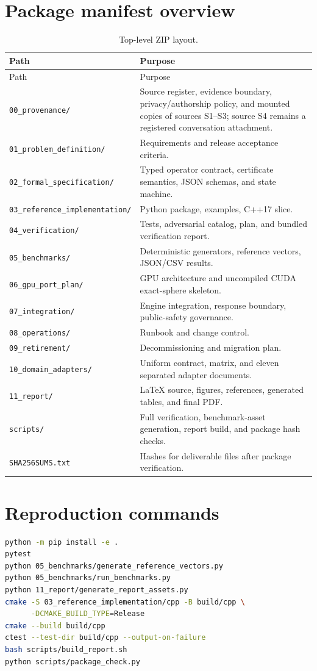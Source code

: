 \documentclass[11pt,a4paper,openany]{book}
\begin{document}
\chapter{Package manifest overview}
\begin{longtable}{@{}L{0.36\textwidth}L{0.54\textwidth}@{}}
\caption{Top-level ZIP layout.}\\
\toprule Path & Purpose \\ \midrule
\endfirsthead
\toprule Path & Purpose \\ \midrule
\endhead
\texttt{00\_provenance/} & Source register, evidence boundary, privacy/authorship policy, and mounted copies of sources S1--S3; source S4 remains a registered conversation attachment. \\
\texttt{01\_problem\_definition/} & Requirements and release acceptance criteria. \\
\texttt{02\_formal\_specification/} & Typed operator contract, certificate semantics, JSON schemas, and state machine. \\
\texttt{03\_reference\_implementation/} & Python package, examples, C++17 slice. \\
\texttt{04\_verification/} & Tests, adversarial catalog, plan, and bundled verification report. \\
\texttt{05\_benchmarks/} & Deterministic generators, reference vectors, JSON/CSV results. \\
\texttt{06\_gpu\_port\_plan/} & GPU architecture and uncompiled CUDA exact-sphere skeleton. \\
\texttt{07\_integration/} & Engine integration, response boundary, public-safety governance. \\
\texttt{08\_operations/} & Runbook and change control. \\
\texttt{09\_retirement/} & Decommissioning and migration plan. \\
\texttt{10\_domain\_adapters/} & Uniform contract, matrix, and eleven separated adapter documents. \\
\texttt{11\_report/} & LaTeX source, figures, references, generated tables, and final PDF. \\
\texttt{scripts/} & Full verification, benchmark-asset generation, report build, and package hash checks. \\
\texttt{SHA256SUMS.txt} & Hashes for deliverable files after package verification. \\
\bottomrule
\end{longtable}

\chapter{Reproduction commands}
\begin{lstlisting}[language=bash,caption={Full local verification.}]
python -m pip install -e .
pytest
python 05_benchmarks/generate_reference_vectors.py
python 05_benchmarks/run_benchmarks.py
python 11_report/generate_report_assets.py
cmake -S 03_reference_implementation/cpp -B build/cpp \
      -DCMAKE_BUILD_TYPE=Release
cmake --build build/cpp
ctest --test-dir build/cpp --output-on-failure
bash scripts/build_report.sh
python scripts/package_check.py
\end{lstlisting}
\end{document}
